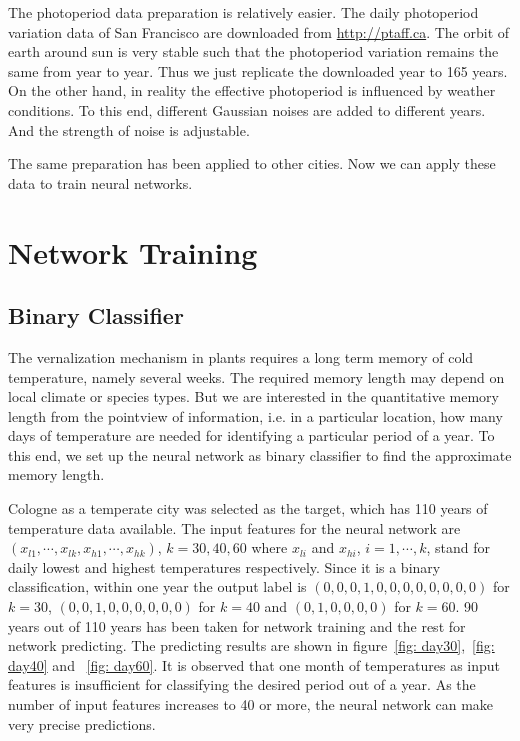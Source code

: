 \documentclass[paper=a4, fontsize=12pt]{scrartcl}	%
\numberwithin{equation}{section}					%
\numberwithin{figure}{section}					%
\numberwithin{table}{section}					%
\begin{document}
The photoperiod data preparation is relatively easier. The daily photoperiod variation data of San Francisco are downloaded from \url{http://ptaff.ca}. The orbit of earth around sun is very stable such that the photoperiod variation remains the same from year to year. Thus we just replicate the downloaded year to 165 years. On the other hand, in reality the effective photoperiod is influenced by weather conditions. To this end, different Gaussian noises are added to different years. And the strength of noise is adjustable. 

The same preparation has been applied to other cities. Now we can apply these data to train neural networks. 

\section{Network Training}
\subsection{Binary Classifier}
The vernalization mechanism in plants requires a long term memory of cold temperature, namely several weeks. The required memory length may depend on local climate or species types. But we are interested in the quantitative memory length from the pointview of information, i.e. in a particular location, how many days of temperature are needed for identifying a particular period of a year. To this end, we set up the neural network as binary classifier to find the approximate memory length. 

Cologne as a temperate city was selected as the target, which has 110 years of temperature data available. The input features for the neural network are $(x_{l1}, \cdots, x_{lk}, x_{h1},\cdots, x_{hk})$, $k=30, 40, 60$ where $x_{li}$ and $x_{hi}$, $i=1,\cdots, k$, stand for daily lowest and highest temperatures respectively. Since it is a binary classification, within one year the output label is $(0, 0, 0, 1, 0, 0, 0, 0, 0, 0, 0, 0)$ for $k=30$, $(0, 0, 1, 0, 0, 0, 0, 0, 0)$ for $k=40$ and $(0, 1, 0, 0, 0, 0)$ for $k=60$. 90 years out of 110 years has been taken for network training and the rest for network predicting. The predicting results are shown in figure~\ref{fig: day30},~\ref{fig: day40} and ~\ref{fig: day60}. It is observed that one month of temperatures as input features is insufficient for classifying the desired period out of a year. As the number of input features increases to 40 or more, the neural network can make very precise predictions. 
\end{document}
